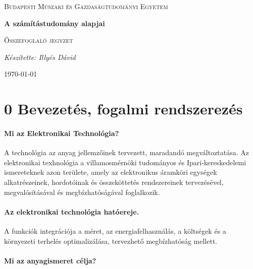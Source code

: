 \documentclass[12pt]{article}
\begin{document}
\begin{titlepage}
	\centering \vfill
	{\textsc{Budapesti Műszaki és Gazdaságtudományi Egyetem} \par} \vspace{7cm}
	{\huge\bfseries A számítástudomány alapjai\par} \vspace{0.5cm}
	{\large \textsc{Összefoglaló jegyzet}\par} \vspace{1.5cm}
	{\Large\itshape Készítette: Illyés Dávid\par} \vfill

	\noindent{}
	
	\vfill {\large \today\par}
\end{titlepage} 
\tableofcontents
{}

    \section{0 Bevezetés, fogalmi rendszerezés}

        \paragraph{Mi az Elektronikai Technológia?} A technológia az anyag jellemzőinek tervezett, maradandó megváltoztatása. Az elektronikai texhnológia a villamosmérnöki tudományos és Ipari-kereskedelemi ismereteknek azon területe, amely az elektronikus áramköri egységek alkatrészeinek, hordotóinak és összeköttetés rendszereinek tervezésével, megvalósításával és megbízhatóságával foglalkozik.

		\paragraph{Az elektronikai technológia hatóereje.} A funkciók integrációja a méret, az energiafelhasználás, a költségek és a környezeti terhelés optimalizálása, tervezhető megbízhatóság mellett.

		\paragraph{Mi az anyagismeret célja?}
\end{document}
